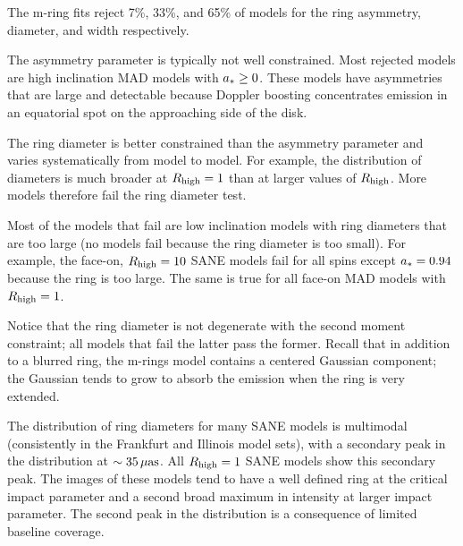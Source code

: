\label{sec:mring}

The m-ring fits reject 7\%, 33\%, and 65\% of models for the ring asymmetry, diameter, and width respectively.

The asymmetry parameter is typically not well constrained. Most rejected models are high inclination MAD models with $a_* \ge 0$.  These models have asymmetries that are large and detectable because Doppler boosting concentrates emission in an equatorial spot on the approaching side of the disk.


The ring diameter is better constrained than the asymmetry parameter and varies systematically from model to model. For example, the distribution of diameters is much broader at $R_\mathrm{high} = 1$ than at larger values of $R_\mathrm{high}$.  More models therefore fail the ring diameter test.

Most of the models that fail are low inclination models with ring diameters that are too large (no models fail because the ring diameter is too small).  For example, the face-on, $R_\mathrm{high} = 10$ SANE models fail for all spins except $a_* = 0.94$ because the ring is too large.  The same is true for all face-on MAD models with $R_\mathrm{high} = 1$.

Notice that the ring diameter is not degenerate with the second moment constraint; all models that fail the latter pass the former.  Recall that in addition to a blurred ring, the m-rings model contains a centered Gaussian component; the Gaussian tends to grow to absorb the emission when the ring is very extended.

The distribution of ring diameters for many SANE models is multimodal (consistently in the Frankfurt and Illinois model sets), with a secondary peak in the distribution at $\sim 35\,\mathrm{\mu as}$.  All $R_\mathrm{high} = 1$ SANE models show this secondary peak.  The images of these models tend to have a well defined ring at the critical impact parameter and a second broad maximum in intensity at larger impact parameter.  The second peak in the distribution is a consequence of limited baseline coverage.

